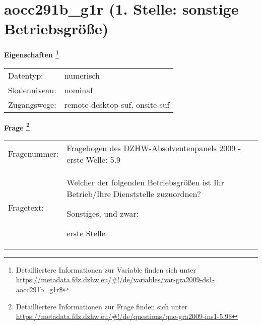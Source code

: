 
    \setcounter{footnote}{0}

    \vspace*{-1.8cm}
	\section{aocc291b\_g1r (1. Stelle: sonstige Betriebsgröße)}
	\label{section:aocc291b_g1r}



    \vspace*{0.5cm}
    \noindent\textbf{Eigenschaften
	\footnote{Detailliertere Informationen zur Variable finden sich unter
		\url{https://metadata.fdz.dzhw.eu/\#!/de/variables/var-gra2009-ds1-aocc291b_g1r$}}}\\
	\begin{tabularx}{\hsize}{@{}lX}
	Datentyp: & numerisch \\
	Skalenniveau: & nominal \\
	Zugangswege: &
	  remote-desktop-suf, 
	  onsite-suf
 \\
    \end{tabularx}



				\vspace*{0.5cm}
                \noindent\textbf{Frage
	                \footnote{Detailliertere Informationen zur Frage finden sich unter
		              \url{https://metadata.fdz.dzhw.eu/\#!/de/questions/que-gra2009-ins1-5.9$}}}\\
				\begin{tabularx}{\hsize}{@{}lX}
					Fragenummer: &
					  Fragebogen des DZHW-Absolventenpanels 2009 - erste Welle:
					  5.9
 \\
					Fragetext: & Welcher der folgenden Betriebsgrößen ist Ihr Betrieb/Ihre Dienststelle zuzuordnen?\par  Sonstiges, und zwar:\par  erste Stelle \\
				\end{tabularx}





